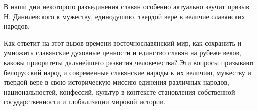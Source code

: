 В наши дни некоторого разъединения славян особенно актуально звучит призыв Н. Данилевского к мужеству, единодушию, твердой вере в величие славянских народов.

Как ответит на этот вызов времени восточнославянский мир, как сохранить и умножить славянские духовные ценности и единство славян на рубеже веков, каковы приоритеты дальнейшего развития человечества? Эти вопросы призывают белорусский народ и современные славянские народы к их величию, мужеству и твердой вере в свою историческую миссию единения различных народов, национальностей, конфессий, культур в контексте становления собственной государственности и глобализации мировой истории.